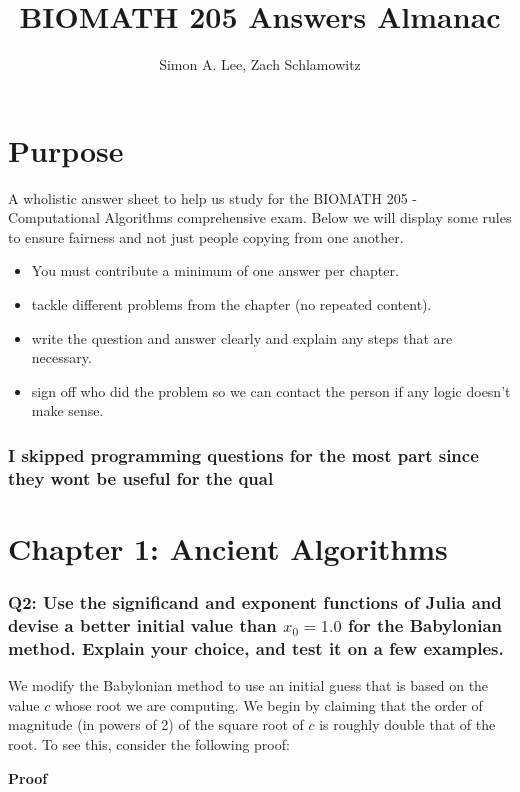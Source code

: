 \documentclass{article}
\title{BIOMATH 205 Answers Almanac}
\author{Simon A. Lee, Zach Schlamowitz}
\date{}
\begin{document}
\maketitle

\section*{Purpose}

A wholistic answer sheet to help us study for the BIOMATH 205 - Computational Algorithms comprehensive exam. Below we will display some rules to ensure fairness and not just people copying from one another.

\begin{itemize}
    \item You must contribute a minimum of one answer per chapter.
    \item tackle different problems from the chapter (no repeated content). 
    \item write the question and answer clearly and explain any steps that are necessary. 
    \item sign off who did the problem so we can contact the person if any logic doesn't make sense.
\end{itemize}

\subsubsection*{I skipped programming questions for the most part since they wont be useful for the qual}

\section*{Chapter 1: Ancient Algorithms}
\subsubsection*{Q2: Use the significand and exponent functions of Julia and devise a better initial value than $x_0 = 1.0$ for the Babylonian method. Explain your choice, and test it on a few examples.}

We modify the Babylonian method to use an initial guess that is based on the value $c$ whose root we are computing. We begin by claiming that the order of magnitude (in powers of 2) of the square root of $c$ is roughly double that of the root. To see this, consider the following proof:

\textbf{Proof}
\end{document}
